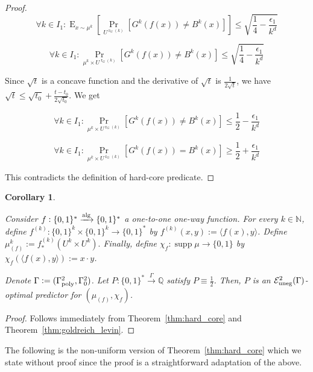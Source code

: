 \documentclass{article}
\numberwithin{equation}{section}
\theoremstyle{definition}
\theoremstyle{plain}
\newtheorem{corollary}{Corollary}[section]
\newcommand{\Words}{{\{ 0, 1 \}^*}}
\newcommand{\WordsLen}[1]{{\{ 0, 1 \}^{#1}}}
\newcommand{\Bool}{\{0,1\}}
\DeclareMathOperator{\Supp}{supp}
\DeclareMathOperator{\Prb}{Pr}
\DeclareMathOperator{\E}{E}
\DeclareMathOperator{\R}{r}
\newcommand{\Nats}{\mathbb{N}}
\newcommand{\Rats}{\mathbb{Q}}
\newcommand{\Chev}[1]{\langle #1 \rangle}
\newcommand{\Fall}{\mathcal{E}}
\newcommand{\Alg}{\xrightarrow{\textnormal{alg}}}
\newcommand{\Scheme}{\xrightarrow{\Gamma}}
\begin{document}
\begin{proof}
$$ \forall k \in I_1: \E_{x \sim \mu^k}[\Prb_{U^{\R_G(k)}}[G^k(f(x)) \ne B^k(x)]] \leq \sqrt{\frac{1}{4} - \frac{\epsilon_1}{k^d}} $$

$$ \forall k \in I_1: \Prb_{\mu^k \times U^{\R_G(k)}}[G^k(f(x)) \ne B^k(x)] \leq \sqrt{\frac{1}{4} - \frac{\epsilon_1}{k^d}} $$

Since $\sqrt{t}$ is a concave function and the derivative of $\sqrt{t}$ is $\frac{1}{2\sqrt{t}}$, we have $\sqrt{t} \leq \sqrt{t_0} + \frac{t-t_0}{2\sqrt{t_0}}$. We get

$$ \forall k \in I_1: \Prb_{\mu^k \times U^{\R_G(k)}}[G^k(f(x)) \ne B^k(x)] \leq \frac{1}{2}-\frac{\epsilon_1}{k^d}$$

$$ \forall k \in I_1: \Prb_{\mu^k \times U^{\R_G(k)}}[G^k(f(x)) = B^k(x)] \geq \frac{1}{2}+\frac{\epsilon_1}{k^d}$$

This contradicts the definition of hard-core predicate.

\end{proof}

\begin{corollary}
\label{thm:one_way}

Consider $f: \Words \Alg \Words$ a one-to-one one-way function. For every $k \in \Nats$, define $f^{(k)}: \WordsLen{k} \times \WordsLen{k} \rightarrow \Words$ by ${f^{(k)}(x,y):=\Chev{f(x),y}}$. Define $\mu_{(f)}^k:=f_*^{(k)}(U^k \times U^k).$ Finally, define $\chi_f: \Supp \mu \rightarrow \Bool$ by ${\chi_f(\Chev{f(x),y}):=x \cdot y}$.

Denote $\Gamma:=(\Gamma_{\textnormal{poly}}^2,\Gamma_0^2)$. Let $P: \Words \Scheme \Rats$ satisfy $P \equiv \frac{1}{2}$. Then, $P$ is an $\Fall_{\textnormal{uneg}}^2(\Gamma)$-optimal predictor for $(\mu_{(f)}, \chi_f)$.

\end{corollary}

\begin{proof}

Follows immediately from Theorem~\ref{thm:hard_core} and Theorem~\ref{thm:goldreich_levin}.

\end{proof}

The following is the non-uniform version of Theorem~\ref{thm:hard_core} which we state without proof since the proof is a straightforward adaptation of the above.
\end{document}
